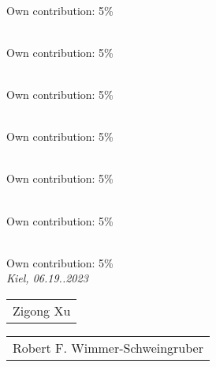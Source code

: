 \documentclass{scrartcl}
\begin{document}
\noindent{}\\ \strut \hfill Own contribution: 5\%\\

\noindent{}\\ \strut \hfill Own contribution: 5\%\\

\noindent{}\\ \strut \hfill Own contribution: 5\%\\

\noindent{}\\ \strut \hfill Own contribution: 5\%\\

\noindent{}\\ \strut \hfill Own contribution: 5\%\\


\noindent{}\\ \strut \hfill Own contribution: 5\%\\


\noindent{}\\ \strut \hfill Own contribution: 5\%\\

	
	
	\noindent\textit{Kiel, 06.19..2023}
	
	\smallskip
	
	\begin{flushright}
		\begin{tabular}{m{8cm}}
			\\ \hline
			\centering Zigong Xu \\
		\end{tabular}
	\end{flushright}
	\bigskip
	\begin{flushright}
		\begin{tabular}{m{8cm}}
			\\ \hline
			\centering Robert F. Wimmer-Schweingruber \\
		\end{tabular}
	\end{flushright}
\end{document}
